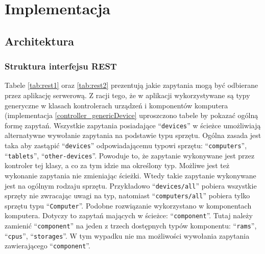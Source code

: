 \chapter{Implementacja}

\section{Architektura}


\subsection{Struktura interfejsu REST}
Tabele \ref{tab:rest1} oraz \ref{tab:rest2} prezentują jakie zapytania mogą być odbierane przez aplikację serwerową. Z racji tego, że w aplikacji wykorzystywane są typy generyczne w klasach kontrolerach urządzeń i komponentów komputera (implementacja \ref{controller_genericDevice} uproszczono tabele by pokazać ogólną formę zapytań. Wszystkie zapytania posiadające "`\texttt{devices}"' w ścieżce umożliwiają alternatywne wywołanie zapytania na podstawie typu sprzętu. Ogólna zasada jest taka aby zastąpić "`\texttt{devices}"' odpowiadającemu typowi sprzętu: "`\texttt{computers}"', "`\texttt{tablets}"', "`\texttt{other-devices}"'. Powoduje to, że zapytanie wykonywane jest przez kontroler tej klasy, a co za tym idzie ma określony typ. Możliwe jest też wykonanie zapytania nie zmieniając ścieżki. Wtedy takie zapytanie wykonywane jest na ogólnym rodzaju sprzętu. Przykładowo "`\texttt{devices/all}"' pobiera wszystkie sprzęty nie zwracając uwagi na typ, natomiast "`\texttt{computers/all}"' pobiera tylko sprzętu typu "`\texttt{Computer}"'. Podobne rozwiązanie wykorzystano w komponentach komputera. Dotyczy to zapytań mających w ścieżce: "`\texttt{component}"'. Tutaj należy zamienić "`\texttt{component}"' na jeden z trzech dostępnych typów komponentu: "`\texttt{rams}"', "`\texttt{cpus}"', "`\texttt{storages}"'. W tym wypadku nie ma możliwości wywołania zapytania zawierającego "`\texttt{component}"'.

